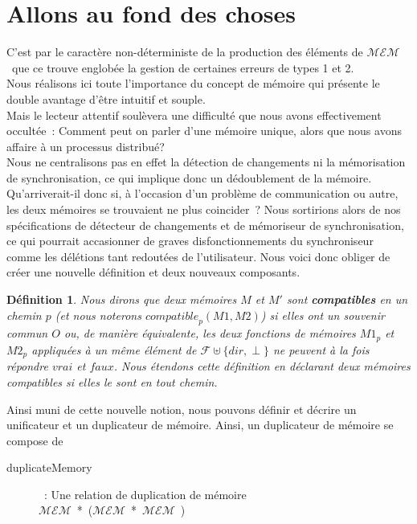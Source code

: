 \documentclass[11pt]{report}
\newtheorem{defi}{D\'efinition}
\newcommand{\mem}{\ensuremath{\mathcal{MEM}}}
\newcommand{\comp}[3]{\ensuremath{\mathit{compatible}_{#1}(#2, #3)}}
\begin{document}
{\section{Allons au fond des choses}
\label{sec:plusfin}
C'est par le caract\`ere non-d\'eterministe de la production des \'el\'ements de
\mem\ que ce trouve englob\'ee la gestion de certaines erreurs de types 1 et 2.\\
Nous r\'ealisons ici toute l'importance du concept de m\'emoire qui pr\'esente le 
double avantage d'\^etre intuitif et souple.\\
Mais le lecteur attentif soul\`evera une difficult\'e que nous avons effectivement occult\'ee~:
Comment peut on parler d'une m\'emoire unique, alors que nous avons affaire \`a un processus 
distribu\'e?\\ 
Nous ne centralisons pas en effet la d\'etection de changements ni la 
m\'emorisation de synchronisation,
ce qui implique donc un d\'edoublement de la m\'emoire. Qu'arriverait-il 
donc si, \`a l'occasion d'un probl\`eme de communication ou autre,
les deux m\'emoires se trouvaient ne plus coincider~? Nous sortirions alors 
de nos sp\'ecifications de d\'etecteur de changements et de m\'emoriseur de
 synchronisation, ce qui pourrait accasionner de graves disfonctionnements 
du synchroniseur comme les d\'el\'etions tant redout\'ees de l'utilisateur.
Nous voici donc obliger de cr\'eer une nouvelle d\'efinition et deux 
nouveaux composants.\\
\begin{defi}
Nous dirons que deux m\'emoires $M$ et $M'$ sont \textbf{compatibles} en un 
chemin $p$ (et nous noterons \comp{p}{M1}{M2}) si elles ont un souvenir 
commun $O$ ou, de mani\`ere \'equivalente, les deux fonctions de m\'emoires 
$M1_{p}$ et $M2_{p}$ appliqu\'ees \`a un m\^eme \'el\'ement de 
$\mathcal{F} \uplus \{dir, \perp \}$ ne peuvent \`a la fois
r\'epondre $\mathit{vrai}$ et $\mathit{faux}$. Nous \'etendons 
cette d\'efinition en d\'eclarant deux m\'emoires compatibles si elles le sont en tout chemin.
\end{defi}
Ainsi muni de cette nouvelle notion, nous pouvons d\'efinir et d\'ecrire un unificateur 
et un duplicateur de m\'emoire.
Ainsi, un duplicateur de m\'emoire se compose de
\begin{description}
\item [duplicateMemory]~: Une relation de duplication de m\'emoire\\
 \mbox{\mem\ * (\mem\ * \mem\ )}
\end{description}
}
\end{document}
